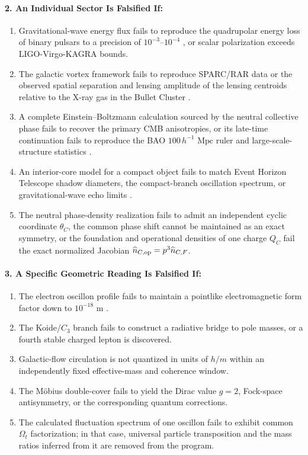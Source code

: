 \documentclass[11pt,a4paper]{article}
\begin{document}
\paragraph{2. An Individual Sector Is Falsified If:}
\begin{enumerate}[label=\arabic*.]
\item Gravitational-wave energy flux fails to reproduce the quadrupolar energy loss of binary pulsars to a precision of $10^{-3}$--$10^{-4}$ \citep{kramer2021}, or scalar polarization exceeds LIGO-Virgo-KAGRA bounds.
\item The galactic vortex framework fails to reproduce SPARC/RAR data \citep{mcgaugh2016} or the observed spatial separation and lensing amplitude of the lensing centroids relative to the X-ray gas in the Bullet Cluster \citep{clowe2006}.
\item A complete Einstein--Boltzmann calculation sourced by the neutral collective phase fails to recover the primary CMB anisotropies, or its late-time continuation fails to reproduce the BAO $100\,h^{-1}\text{ Mpc}$ ruler and large-scale-structure statistics \citep{eisenstein2005}.
\item An interior-core model for a compact object fails to match Event Horizon Telescope shadow diameters, the compact-branch oscillation spectrum, or gravitational-wave echo limits \citep{cardoso2019}.
\item The neutral phase-density realization fails to admit an independent cyclic coordinate $\theta_C$, the common phase shift cannot be maintained as an exact symmetry, or the foundation and operational densities of one charge $Q_C$ fail the exact normalized Jacobian $\widehat n_{C,{\rm op}}=p^3\widehat n_{C,F}$.
\end{enumerate}

\paragraph{3. A Specific Geometric Reading Is Falsified If:}
\begin{enumerate}[label=\arabic*.]
\item The electron oscillon profile fails to maintain a pointlike electromagnetic form factor down to $10^{-18}\text{ m}$ \citep{navas2024}.
\item The Koide/$C_3$ branch fails to construct a radiative bridge to pole masses, or a fourth stable charged lepton is discovered.
\item Galactic-flow circulation is not quantized in units of $h/m$ within an independently fixed effective-mass and coherence window.
\item The Möbius double-cover fails to yield the Dirac value $g=2$, Fock-space antisymmetry, or the corresponding quantum corrections.
\item The calculated fluctuation spectrum of one oscillon fails to exhibit common $\Omega_t$ factorization; in that case, universal particle transposition and the mass ratios inferred from it are removed from the program.
\end{enumerate}
\end{document}
